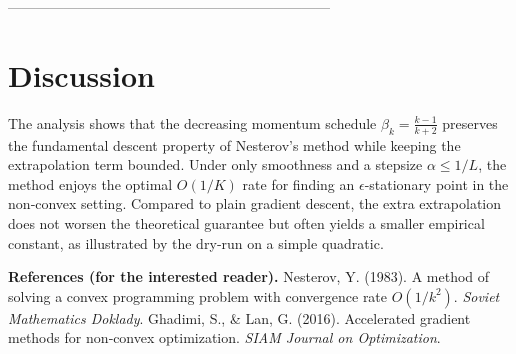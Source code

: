 \documentclass[11pt]{article}
\begin{document}
---------------------------------------------------------------------

\section*{Discussion}
The analysis shows that the decreasing momentum schedule \(\beta_k=\frac{k-1}{k+2}\) preserves the fundamental descent property of Nesterov’s method while keeping the extrapolation term bounded. Under only smoothness and a stepsize \(\alpha\le 1/L\), the method enjoys the optimal \(O(1/K)\) rate for finding an \(\epsilon\)-stationary point in the non‑convex setting. Compared to plain gradient descent, the extra extrapolation does not worsen the theoretical guarantee but often yields a smaller empirical constant, as illustrated by the dry‑run on a simple quadratic.

\bigskip
\noindent\textbf{References (for the interested reader).}  
Nesterov, Y. (1983). A method of solving a convex programming problem with convergence rate \(O(1/k^{2})\). \emph{Soviet Mathematics Doklady}.  
Ghadimi, S., & Lan, G. (2016). Accelerated gradient methods for non‑convex optimization. \emph{SIAM Journal on Optimization}.
\end{document}
